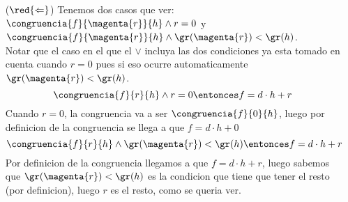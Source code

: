 \begin{enumerate}[label=\roman*)]
\begin{itemize}
          \item[($\red{\Leftarrow}$)]
                Tenemos dos casos que ver:
                $\congruencia{f}{\magenta{r}}{h} \land r = 0$ y $\congruencia{f}{\magenta{r}}{h} \land \gr(\magenta{r}) < \gr(h)$.\\
                Notar que el caso en el que el $\lor$ incluya las dos condiciones ya esta tomado en cuenta cuando $r = 0$ pues si eso ocurre
                automaticamente $\gr(\magenta{r}) < \gr(h)$.
                $$
                \congruencia{f}{r}{h} \land r = 0 \entonces f = d\cdot h + r
                $$
                Cuando $r=0$, la congruencia va a ser $\congruencia{f}{0}{h}$, luego por definicion de la congruencia se llega a que 
                $f = d\cdot h + 0$
                $$
                \congruencia{f}{r}{h} \land \gr(\magenta{r}) < \gr(h) \entonces f = d\cdot h + r
                $$
                Por definicion de la congruencia llegamos a que $f = d\cdot h + r$, luego sabemos que $\gr(\magenta{r}) < \gr(h)$ es la condicion
                que tiene que tener el resto (por definicion), luego $r$ es el resto, como se queria ver.
        \end{itemize}
\end{enumerate}

\begin{aportes}
  \item {}
  \item {}
\end{aportes}
